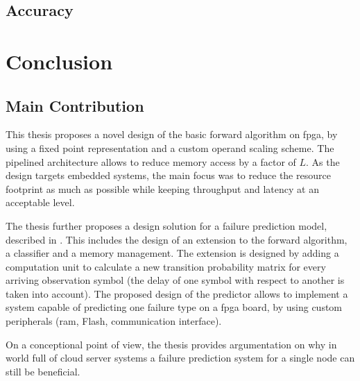 \documentclass[mscthesis]{usiinfthesis}
\begin{document}
\section{Accuracy}

\chapter{Conclusion}
\label{ch:conc}
\glsresetall %

\section{Main Contribution}
\label{ch:conc_ach}

This thesis proposes a novel design of the basic forward algorithm on
\gls{fpga}, by using a fixed point representation and a custom operand scaling
scheme. The pipelined architecture allows to reduce memory access by a factor
of $L$. As the design targets embedded systems, the main focus was to reduce
the resource footprint as much as possible while keeping throughput and latency
at an acceptable level.

The thesis further proposes a design solution for a failure prediction model,
described in \cite{salfner08}. This includes the design of an extension to the
forward algorithm, a classifier and a memory management. The extension is
designed by adding a computation unit to calculate a new transition
probability matrix for every arriving observation symbol (the delay of one
symbol with respect to another is taken into account). The proposed design
of the predictor allows to implement a system capable of predicting one failure
type on a \gls{fpga} board, by using custom peripherals (\gls{ram}, Flash,
communication interface).

On a conceptional point of view, the thesis provides argumentation on why
in world full of cloud server systems a failure prediction system for a single
node can still be beneficial.

\end{document}
